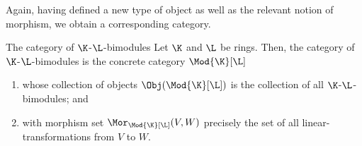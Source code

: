 Again, having defined a new type of object as well as the relevant notion of morphism, we obtain a corresponding category.
\begin{exm}{The category of $\K$-$\L$-bimodules}{}
	Let $\K$ and $\L$ be rings.  Then, the category of $\K$-$\L$-bimodules is the concrete category $\Mod{\K}[\L]$\index[notation]{$\Mod{\K}[\L]$}
	\begin{enumerate}
		\item whose collection of objects $\Obj (\Mod{\K}[\L])$ is the collection of all $\K$-$\L$-bimodules; and
		\item with morphism set $\Mor _{\Mod{\K}[\L]}(V,W)$ precisely the set of all linear-transformations from $V$ to $W$.
	\end{enumerate}
\end{exm}

